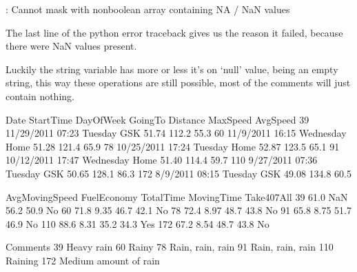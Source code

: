 \documentclass[letterpaper,10pt,english]{jupyterBook}
\begin{document}
\begin{sphinxVerbatim}[commandchars=\\\{\}]
: Cannot mask with non\PYGZhy{}boolean array containing NA / NaN values
\end{sphinxVerbatim}

\sphinxAtStartPar
The last line of the python error traceback gives us the reason it failed, because there were NaN values present.

\sphinxAtStartPar
Luckily the string variable has more or less it’s on ‘null’ value, being an empty string, this way these operations are still possible, most of the comments will just contain nothing.

\begin{sphinxVerbatim}[commandchars=\\\{\}]
  
\end{sphinxVerbatim}

\begin{sphinxVerbatim}[commandchars=\\\{\}]
\PYG{p}{[}\PYG{p}{]}
\end{sphinxVerbatim}

\begin{sphinxVerbatim}[commandchars=\\\{\}]
           Date StartTime  DayOfWeek GoingTo  Distance  MaxSpeed  AvgSpeed  \PYGZbs{}
39   11/29/2011     07:23    Tuesday     GSK     51.74     112.2      55.3   
60    11/9/2011     16:15  Wednesday    Home     51.28     121.4      65.9   
78   10/25/2011     17:24    Tuesday    Home     52.87     123.5      65.1   
91   10/12/2011     17:47  Wednesday    Home     51.40     114.4      59.7   
110   9/27/2011     07:36    Tuesday     GSK     50.65     128.1      86.3   
172    8/9/2011     08:15    Tuesday     GSK     49.08     134.8      60.5   

     AvgMovingSpeed FuelEconomy  TotalTime  MovingTime Take407All  \PYGZbs{}
39             61.0         NaN       56.2        50.9         No   
60             71.8        9.35       46.7        42.1         No   
78             72.4        8.97       48.7        43.8         No   
91             65.8        8.75       51.7        46.9         No   
110            88.6        8.31       35.2        34.3        Yes   
172            67.2        8.54       48.7        43.8         No   

                  Comments  
39              Heavy rain  
60                   Rainy  
78        Rain, rain, rain  
91        Rain, rain, rain  
110                Raining  
172  Medium amount of rain  
\end{sphinxVerbatim}
\end{document}
